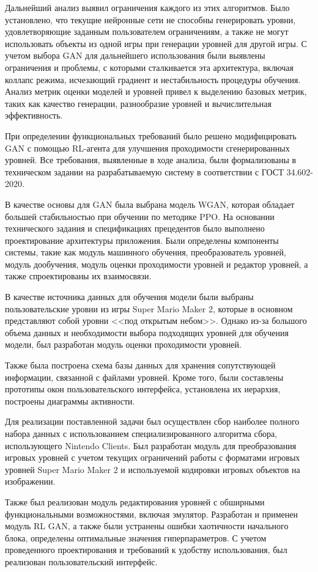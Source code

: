 \documentclass[PI, VKR]{HSEUniversity}
\begin{document}
Дальнейший анализ выявил ограничения каждого из этих алгоритмов. Было установлено, что текущие нейронные сети не способны генерировать уровни, удовлетворяющие заданным пользователем ограничениям, а также не могут использовать объекты из одной игры при генерации уровней для другой игры. С учетом выбора GAN для дальнейшего использования были выявлены ограничения и проблемы, с которыми сталкивается эта архитектура, включая коллапс режима, исчезающий градиент и нестабильность процедуры обучения.
Анализ метрик оценки моделей и уровней привел к выделению базовых метрик, таких как качество генерации, разнообразие уровней и вычислительная эффективность.

При определении функциональных требований было решено модифицировать GAN с помощью RL-агента для улучшения проходимости сгенерированных уровней. Все требования, выявленные в ходе анализа, были формализованы в техническом задании на разрабатываемую систему в соответствии с ГОСТ 34.602-2020.

В качестве основы для GAN была выбрана модель WGAN, которая обладает большей стабильностью при обучении по методике PPO. На основании технического задания и спецификациях прецедентов было выполнено проектирование архитектуры приложения. Были определены компоненты системы, такие как модуль машинного обучения, преобразователь уровней, модуль дообучения, модуль оценки проходимости уровней и редактор уровней, а также спроектированы их взаимосвязи.

В качестве источника данных для обучения модели были выбраны пользовательские уровни из игры Super Mario Maker 2, которые в основном представляют собой уровни {}<<под открытым небом>>{}. Однако из-за большого объема данных и необходимости выбора подходящих уровней для обучения модели, был разработан модуль оценки проходимости уровней.

Также была построена схема базы данных для хранения сопутствующей информации, связанной с файлами уровней. Кроме того, были составлены прототипы окон пользовательского интерфейса, установлена их иерархия, построены диаграммы активности.

Для реализации поставленной задачи был осуществлен сбор наиболее полного набора данных с использованием специализированного алгоритма сбора, использующего Nintendo Clients. Был разработан модуль для преобразования игровых уровней с учетом текущих ограничений работы с форматами игровых уровней Super Mario Maker 2 и используемой кодировки игровых объектов на изображении.

Также был реализован модуль редактирования уровней с обширными функциональными возможностями, включая эмулятор. Разработан и применен модуль RL GAN, а также были устранены ошибки хаотичности начального блока, определены оптимальные значения гиперпараметров. С учетом проведенного проектирования и требований к удобству использования, был реализован пользовательский интерфейс.
\end{document}
